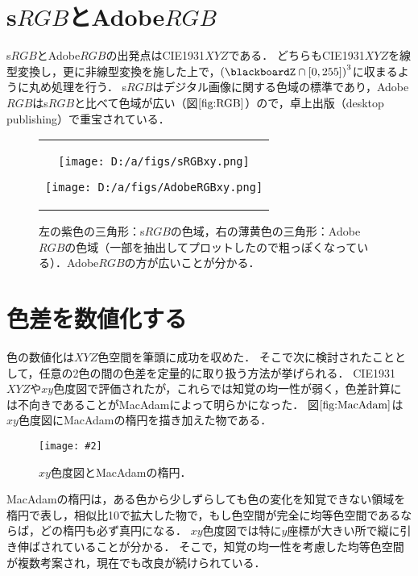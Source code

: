 \documentclass[uplatex,paper=a4,fontsize=4.0truemm,jafontsize=4.0truemm,head_space=30.0truemm,foot_space=30.0truemm,baselineskip=8.0truemm,line_length=40zw,gutter=25.0truemm,oneside,openany,fleqn,hanging_panctuation,open_bracket_pos=nibu_tentsuki,dvipdfmx,jis2004,book,titlepage]{jlreq}
\theoremstyle{mystyle}
\newcommand{\captiondot}[1]{\caption{#1．}}
\newcommand{\figureinput}[4]{\begin{figure}[btp]\centering\texttt{[image: \#2]}\captiondot{#3}\label{fig:#4}\end{figure}}
\newcommand{\mathdisplaystyle}[1]{\(\displaystyle{#1}\)}
\newcommand{\Reference}[1]{\mathdisplaystyle{\ref{#1}}}
\newcommand{\parentheses}[1]{\left(#1\right)}
\newcommand{\squarebrackets}[1]{\left[#1\right]}
\begin{document}
		\section{s\mathdisplaystyle{RGB}とAdobe\mathdisplaystyle{RGB}}
			s\mathdisplaystyle{RGB}とAdobe\mathdisplaystyle{RGB}の出発点はCIE1931\mathdisplaystyle{XYZ}である．
			どちらもCIE1931\mathdisplaystyle{XYZ}を線型変換し，更に非線型変換を施した上で，\mathdisplaystyle{\parentheses{\blackboardZ\cap\squarebrackets{0,255}}^3}に収まるように丸め処理を行う．
			s\mathdisplaystyle{RGB}はデジタル画像に関する色域の標準であり，Adobe\mathdisplaystyle{RGB}はs\mathdisplaystyle{RGB}と比べて色域が広い（図\Reference{fig:RGB}）ので，卓上出版（desktop publishing）で重宝されている．
			\begin{figure}[tbp]
				\centering
				\begin{tabular}{c}
					\begin{minipage}{0.5\linewidth}
						\centering
						\texttt{[image: D:/a/figs/sRGBxy.png]}
					\end{minipage}
					\begin{minipage}{0.5\linewidth}
						\centering
						\texttt{[image: D:/a/figs/AdobeRGBxy.png]}
					\end{minipage}
				\end{tabular}
				\captiondot{左の紫色の三角形：s\mathdisplaystyle{RGB}の色域，右の薄黄色の三角形：Adobe\mathdisplaystyle{RGB}の色域（一部を抽出してプロットしたので粗っぽくなっている）．Adobe\mathdisplaystyle{RGB}の方が広いことが分かる}\label{fig:RGB}
			\end{figure}
		\section{色差を数値化する}
			色の数値化は\mathdisplaystyle{XYZ}色空間を筆頭に成功を収めた．
			そこで次に検討されたこととして，任意の2色の間の色差を定量的に取り扱う方法が挙げられる．
			CIE1931\mathdisplaystyle{XYZ}や\mathdisplaystyle{xy}色度図で評価されたが，これらでは知覚の均一性が弱く，色差計算には不向きであることがMacAdamによって明らかになった\cite{MacAdam1942}．
			図\Reference{fig:MacAdam}は\mathdisplaystyle{xy}色度図にMacAdamの楕円を描き加えた物である．
			\figureinput{width=\linewidth}{D:/a/figs/MacAdam.png}{\mathdisplaystyle{xy}色度図とMacAdamの楕円}{MacAdam}
			MacAdamの楕円は，ある色から少しずらしても色の変化を知覚できない領域を楕円で表し，相似比10で拡大した物で，もし色空間が完全に均等色空間であるならば，どの楕円も必ず真円になる．
			\mathdisplaystyle{xy}色度図では特に\mathdisplaystyle{y}座標が大きい所で縦に引き伸ばされていることが分かる．
			そこで，知覚の均一性を考慮した均等色空間が複数考案され，現在でも改良が続けられている．
\end{document}
